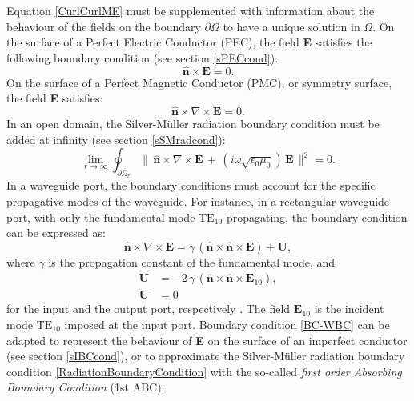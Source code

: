 Equation \ref{CurlCurlME} must be supplemented with information about the behaviour of the fields on the boundary $\partial\Omega$ to have a unique solution in $\Omega$. On the surface of a Perfect Electric Conductor (PEC), the field \textbf{E} satisfies the following boundary condition (see section \ref{sPECcond}):
\begin{equation}\label{BC-PEC}
	\mathbf{\hat{n}}\times\mathbf{E} = 0.
\end{equation}
On the surface of a Perfect Magnetic Conductor (PMC), or symmetry surface, the field \textbf{E} satisfies:
\begin{equation}\label{BC-PMC}
	\mathbf{\hat{n}}\times\nabla\times\mathbf{E} = 0.
\end{equation}
In an open domain, the Silver-M\"{u}ller radiation boundary condition must be added at infinity (see section \ref{sSMradcond}):
\begin{equation}\label{RadiationBoundaryCondition}
	\lim_{r\rightarrow\infty}\oint_{\partial\Omega_{r}}\|\,\mathbf{\hat{n}}\times\nabla\times\mathbf{E}\, +\,(i\omega\sqrt{\epsilon_{0}\mu_{0}})\,\mathbf{E}\,\|^{2} = 0.
\end{equation}
In a waveguide port, the boundary conditions must account for the specific propagative modes of the waveguide. For instance, in a rectangular waveguide port, with only the fundamental mode $\text{TE}_{10}$ propagating, the boundary condition can be expressed as:
\begin{equation}\label{BC-WBC}
	\mathbf{\hat{n}}\times\nabla\times\mathbf{E} = \gamma\,(\mathbf{\hat{n}}\times\mathbf{\hat{n}}\times\mathbf{E}) + \mathbf{U},
\end{equation}
where $\gamma$ is the propagation constant of the fundamental mode, and
\begin{equation}\label{WGPortConditionsU}
	\begin{aligned}
		\mathbf{U} &= -2\,\gamma\,(\mathbf{\hat{n}}\times\mathbf{\hat{n}}\times\mathbf{E}_{10}),
		\\
		\mathbf{U} &= 0
	\end{aligned}
\end{equation}
for the input and the output port, respectively \cite{Jin}. The field $\mathbf{E}_{10}$ is the incident mode $\text{TE}_{10}$ imposed at the input port. Boundary condition \eqref{BC-WBC} can be adapted to represent the behaviour of \textbf{E} on the surface of an imperfect conductor (see section \ref{sIBCcond}), or to approximate the Silver-M\"{u}ller radiation boundary condition \eqref{RadiationBoundaryCondition} with the so-called \textit{first order Absorbing Boundary Condition} (1st ABC):
